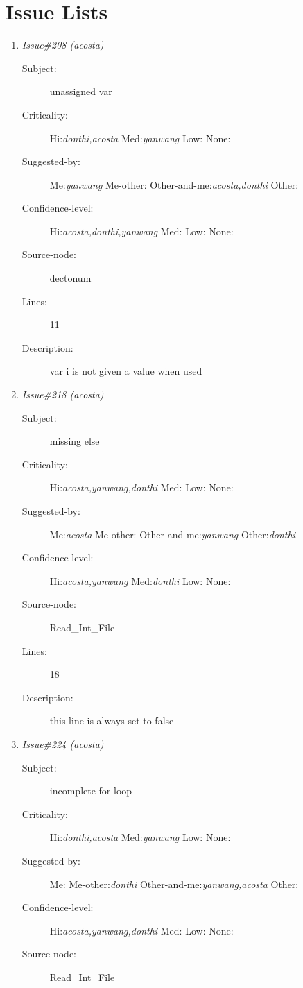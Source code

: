 \section{Issue Lists}
\begin{enumerate}
\item {\it Issue\#208 (acosta)}
\begin{description}
\item [Subject:] unassigned var
\item [Criticality:] Hi:{\it donthi,acosta} Med:{\it yanwang} Low:{\it } None:{\it }
\item [Suggested-by:] Me:{\it yanwang} Me-other:{\it } Other-and-me:{\it acosta,donthi} Other:{\it }
\item [Confidence-level:] Hi:{\it acosta,donthi,yanwang} Med:{\it } Low:{\it } None:{\it }
\item [Source-node:] dectonum

\item [Lines:] 11

\item [Description:] var i is not given a value when used
\end{description}
\item {\it Issue\#218 (acosta)}
\begin{description}
\item [Subject:] missing else
\item [Criticality:] Hi:{\it acosta,yanwang,donthi} Med:{\it } Low:{\it } None:{\it }
\item [Suggested-by:] Me:{\it acosta} Me-other:{\it } Other-and-me:{\it yanwang} Other:{\it donthi}
\item [Confidence-level:] Hi:{\it acosta,yanwang} Med:{\it donthi} Low:{\it } None:{\it }
\item [Source-node:] Read\_Int\_File

\item [Lines:] 18

\item [Description:] this line is always set to false
\end{description}
\item {\it Issue\#224 (acosta)}
\begin{description}
\item [Subject:] incomplete for loop
\item [Criticality:] Hi:{\it donthi,acosta} Med:{\it yanwang} Low:{\it } None:{\it }
\item [Suggested-by:] Me:{\it } Me-other:{\it donthi} Other-and-me:{\it yanwang,acosta} Other:{\it }
\item [Confidence-level:] Hi:{\it acosta,yanwang,donthi} Med:{\it } Low:{\it } None:{\it }
\item [Source-node:] Read\_Int\_File


\end{description}
\end{enumerate}
